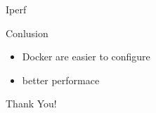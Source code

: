 \documentclass[10pt]{beamer}
\begin{document}
\begin{frame}{Iperf}
\end{frame}

\begin{frame}{Conlusion}
  \begin{itemize}
    \item Docker are easier to configure
    \item better performace
  \end{itemize}
\end{frame}

{
\begin{frame}[standout]
\thispagestyle{empty}
  {\LARGE Thank You!}
\end{frame}
}
\end{document}

